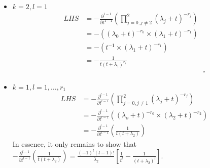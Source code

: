 \begin{itemize}
    \item \(k = 2, l = 1\)
    \begin{equation*}
        \begin{split}
            LHS &= - \frac{\partial^{1-1}}{\partial t^{1-1}} 
            \left( \prod_{j=0, j \neq 2}^{2} (\lambda_j + t)^{-r_j} \right) \\
            &=-\left( (\lambda_0 + t)^{-r_0} \times (\lambda_1 + t)^{-r_1} \right) \\
            &=-\left( t^{-1} \times (\lambda_1 + t)^{-r_1} \right) \\ 
            &= - \frac{1}{t(t + \lambda_1)^{r_1}} \\
            & \hspace{7cm} \square
        \end{split}
    \end{equation*}
    \item \(k = 1, l = 1, \dots, r_1\)
    \begin{equation*}
        \begin{split}
            LHS &= -\frac{\partial^{l-1}}{\partial t^{l-1}} 
            \left( \prod_{j=0, j \neq 1}^{2} (\lambda_j + t)^{-r_j} \right) \\
            &= -\frac{\partial^{l-1}}{\partial t^{l-1}}
            \left( (\lambda_o + t)^{-r_0} \times (\lambda_2 + t)^{-r_2} \right) \\
            &= -\frac{\partial^{l-1}}{\partial t^{l-1}}
            \left( \frac{1}{t(t + \lambda_2)}\right)
        \end{split}
    \end{equation*}
    In essence, it only remains to show that 
    \(-\frac{\partial^{l-1}}{\partial t^{l-1}} 
    \left( \frac{1}{t(t + \lambda_2)}\right) = \frac{(-1)^{l} (l-1)!}{\lambda_2}
    \left[\frac{1}{t^l} - \frac{1}{(t + \lambda_2)^l}\right]\).
    

\end{itemize}
